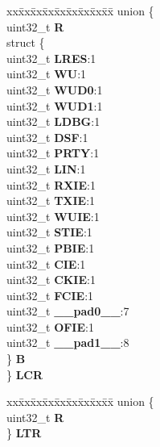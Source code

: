 \begin{DoxyCompactItemize}
\begin{tabbing}
\end{tabbing}\item 
\mbox{\label{structESCI__tag_acce1419d35a389cef086cad0b68e3732}} 
\begin{tabbing}
xx\=xx\=xx\=xx\=xx\=xx\=xx\=xx\=xx\=\kill
union \{\\
\>uint32\_t {\bfseries R}\\
\>struct \{\\
\>\>uint32\_t {\bfseries LRES}:1\\
\>\>uint32\_t {\bfseries WU}:1\\
\>\>uint32\_t {\bfseries WUD0}:1\\
\>\>uint32\_t {\bfseries WUD1}:1\\
\>\>uint32\_t {\bfseries LDBG}:1\\
\>\>uint32\_t {\bfseries DSF}:1\\
\>\>uint32\_t {\bfseries PRTY}:1\\
\>\>uint32\_t {\bfseries LIN}:1\\
\>\>uint32\_t {\bfseries RXIE}:1\\
\>\>uint32\_t {\bfseries TXIE}:1\\
\>\>uint32\_t {\bfseries WUIE}:1\\
\>\>uint32\_t {\bfseries STIE}:1\\
\>\>uint32\_t {\bfseries PBIE}:1\\
\>\>uint32\_t {\bfseries CIE}:1\\
\>\>uint32\_t {\bfseries CKIE}:1\\
\>\>uint32\_t {\bfseries FCIE}:1\\
\>\>uint32\_t {\bfseries \_\_pad0\_\_}:7\\
\>\>uint32\_t {\bfseries OFIE}:1\\
\>\>uint32\_t {\bfseries \_\_pad1\_\_}:8\\
\>\} {\bfseries B}\\
\} {\bfseries LCR}\\

\end{tabbing}\item 
\mbox{\label{structESCI__tag_a787ccd6b36f0391b6b64e164a3f69dfe}} 
\begin{tabbing}
xx\=xx\=xx\=xx\=xx\=xx\=xx\=xx\=xx\=\kill
union \{\\
\>uint32\_t {\bfseries R}\\
\} {\bfseries LTR}\\


\end{tabbing}
\end{DoxyCompactItemize}
